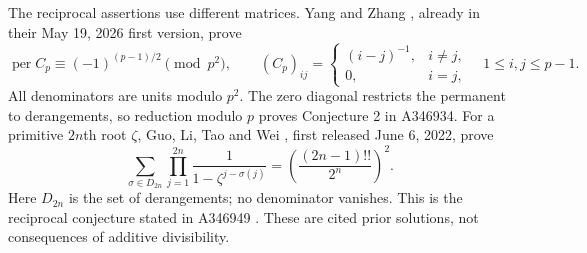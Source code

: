\documentclass[11pt]{article}
\newcommand{\per}{\operatorname{per}}
\begin{document}
The reciprocal assertions use different matrices.
Yang and Zhang \cite[Theorem 2, (12)]{yangzhang}, already in their
May 19, 2026 first version, prove
\[
 \per C_p\equiv(-1)^{(p-1)/2}\pmod{p^2},\qquad
 (C_p)_{ij}=\begin{cases}(i-j)^{-1},&i\ne j,\\0,&i=j,\end{cases}
 \quad 1\le i,j\le p-1.
\]
All denominators are units modulo $p^2$. The zero diagonal restricts
the permanent to derangements, so reduction modulo $p$ proves
Conjecture 2 in A346934.
For a primitive $2n$th root $\zeta$, Guo, Li, Tao and Wei
\cite[(1.1), proof in Section 3]{guo}, first released June 6, 2022, prove
\[
 \sum_{\sigma\in D_{2n}}\prod_{j=1}^{2n}
 \frac1{1-\zeta^{j-\sigma(j)}}
 =\left(\frac{(2n-1)!!}{2^n}\right)^2.
\]
Here $D_{2n}$ is the set of derangements; no denominator vanishes.
This is the reciprocal conjecture stated in A346949 \cite{roots}.
These are cited prior solutions, not consequences of additive divisibility.
\end{document}
